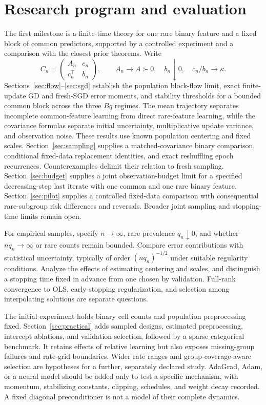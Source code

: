 \section{Research program and evaluation}

The first milestone is a finite-time theory for one rare binary feature and a
fixed block of common predictors, supported by a controlled experiment and a
comparison with the closest prior theorems. Write
\[
 C_n = \begin{pmatrix}
        A_n      & c_n \\
        c_n^\top & b_n
       \end{pmatrix},\qquad A_n
     \to A
     \succ 0,\quad b_n
     \downarrow 0,\quad c_n/b_n
     \to \kappa.
\]
Sections~\ref{sec:flow}--\ref{sec:sgd} establish the population block-flow
limit, exact finite-update GD and fresh-SGD error moments, and stability
thresholds for a bounded common block across the three $Bq$ regimes. The mean
trajectory separates incomplete common-feature learning from direct rare-feature
learning, while the covariance formulas separate initial uncertainty,
multiplicative update variance, and observation noise. These results use known
population centering and fixed scales. Section~\ref{sec:sampling} supplies a
matched-covariance binary comparison, conditional fixed-data replacement
identities, and exact reshuffling epoch recurrences. Counterexamples delimit
their relation to fresh sampling. Section~\ref{sec:budget} supplies a joint
observation-budget limit for a specified decreasing-step last iterate with one
common and one rare binary feature. Section~\ref{sec:pilot} supplies a
controlled fixed-data comparison with consequential rare-subgroup risk
differences and reversals. Broader joint sampling and stopping-time limits
remain open.

For empirical samples, specify $n \to \infty$, rare prevalence
$q_n \downarrow 0$, and whether $nq_n \to \infty$ or rare counts remain bounded.
Compare error contributions with statistical uncertainty, typically of order
$(nq_n)^{-1/2}$ under suitable regularity conditions. Analyze the effects of
estimating centering and scales, and distinguish a stopping time fixed in
advance from one chosen by validation. Full-rank convergence to OLS,
early-stopping regularization, and selection among interpolating solutions are
separate questions.

The initial experiment holds binary cell counts and population preprocessing
fixed. Section~\ref{sec:practical} adds sampled designs, estimated
preprocessing, intercept ablations, and validation selection, followed by a
sparse categorical benchmark. It retains effects of relative learning but also
exposes missing-group failures and rate-grid boundaries. Wider rate ranges and
group-coverage-aware selection are hypotheses for a further, separately declared
study. AdaGrad, Adam, or a neural model should be added only to test a specific
mechanism, with momentum, stabilizing constants, clipping, schedules, and weight
decay recorded. A fixed diagonal preconditioner is not a model of their complete
dynamics.

